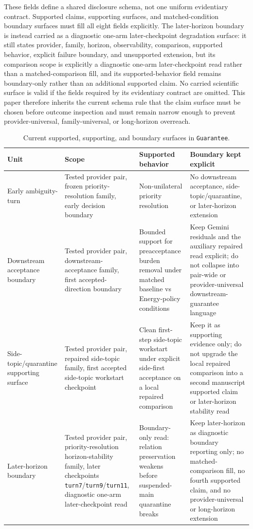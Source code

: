 \documentclass[11pt]{article}
\begin{document}
These fields define a shared disclosure schema, not one uniform evidentiary
contract. Supported claims, supporting surfaces, and matched-condition boundary
surfaces must fill all eight fields explicitly. The later-horizon boundary is
instead carried as a diagnostic one-arm later-checkpoint degradation surface:
it still states provider, family, horizon, observability, comparison, supported
behavior, explicit failure boundary, and unsupported extension, but its
comparison scope is explicitly a diagnostic one-arm later-checkpoint read
rather than a matched-comparison fill, and its supported-behavior field remains
boundary-only rather than an additional supported claim. No carried scientific
surface is valid if the fields required by its evidentiary contract are
omitted. This paper therefore inherits the current schema rule that the claim
surface must be chosen before outcome inspection and must remain narrow enough
to prevent provider-universal, family-universal, or long-horizon overreach.

\begin{table}[ht]
\centering
\begin{tabular}{|p{}|p{}|p{}|p{}|}
\hline
\textbf{Unit} & \textbf{Scope} & \textbf{Supported behavior} & \textbf{Boundary kept explicit} \\
\hline
Early ambiguity-turn & Tested provider pair, frozen priority-resolution family, early decision boundary & Non-unilateral priority resolution & No downstream acceptance, side-topic/quarantine, or later-horizon extension \\
\hline
Downstream acceptance boundary & Tested provider pair, downstream-acceptance family, first accepted-direction boundary & Bounded support for preacceptance burden removal under matched baseline vs Energy-policy conditions & Keep Gemini residuals and the auxiliary repaired read explicit; do not collapse into pair-wide or provider-universal downstream-guarantee language \\
\hline
Side-topic/quarantine supporting surface & Tested provider pair, repaired side-topic family, first accepted side-topic workstart checkpoint & Clean first-step side-topic workstart under explicit side-first acceptance on a local repaired comparison & Keep it as supporting evidence only; do not upgrade the local repaired comparison into a second manuscript supported claim or later-horizon stability read \\
\hline
Later-horizon boundary & Tested provider pair, priority-resolution horizon-stability family, later checkpoints \texttt{turn7}/\texttt{turn9}/\texttt{turn11}, diagnostic one-arm later-checkpoint read & Boundary-only read: relation preservation weakens before suspended-main quarantine breaks & Keep later-horizon as diagnostic boundary reporting only; no matched-comparison fill, no fourth supported claim, and no provider-universal or long-horizon extension \\
\hline
\end{tabular}
\caption{Current supported, supporting, and boundary surfaces in
\texttt{Guarantee}.}
\end{table}
\end{document}

